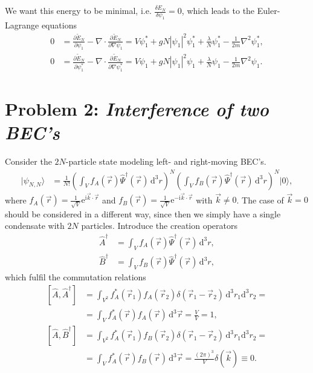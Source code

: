 \documentclass[english, parskip=full]{scrartcl}
\newcommand{\intr}{}
\newcommand{\kla}{}
\newcommand{\klam}{}
\newcommand{\tecxt}{}
\newcommand{\Ket}{}
\renewcommand{\i}{\text{i}}
\newcommand{\e}{\text{e}}
\begin{document}
We want this energy to be minimal, i.e. $\frac{\delta E_N}{\delta \psi_1} = 0$, which leads to the Euler-Lagrange equations
\begin{align}
0 &= \frac{\partial \tilde{E}_N}{\partial \psi_1} - \nabla\cdot \frac{\partial \tilde{E}_N}{\partial \nabla\psi_1} = V\psi_1^\ast + gN |\psi_1|^2 \psi_1^\ast + \frac{\lambda}{N}\psi_1^\ast - \frac{1}{2m}\nabla^2\psi_1^\ast,\\
0 &= \frac{\partial \tilde{E}_N}{\partial \psi_1^\ast} - \nabla\cdot \frac{\partial \tilde{E}_N}{\partial \nabla\psi_1^\ast} = V\psi_1 + gN |\psi_1|^2 \psi_1 + \frac{\lambda}{N}\psi_1 - \frac{1}{2m}\nabla^2\psi_1.
\end{align}




\newpage
\section*{Problem 2: \normalfont\textit{\large{Interference of two BEC's}}}
Consider the $2N$-particle state modeling left- and right-moving BEC's.
\begin{align}
\Ket | \psi_{N,N} \rangle &= \frac{1}{N!} \kla\left( \int_{V} f_A(\vec{r}) \hat{\Psi}^\dagger (\vec{r}) \, \mathrm{d}^{3}r \right)^N  \kla\left( \int_{V} f_B(\vec{r}) \hat{\Psi}^\dagger (\vec{r}) \, \mathrm{d}^{3}r \right)^N \Ket | 0 \rangle,
\end{align}
where $f_A(\vec{r}) = \frac{1}{\sqrt{V}} \e^{\i\vec{k}\cdot\vec{r}}$ and $f_B(\vec{r}) = \frac{1}{\sqrt{V}} \e^{-\i\vec{k}\cdot\vec{r}}$ with $\vec{k} \neq 0$. 
The case of $\vec{k} = 0$ should be considered in a different way, since then we simply have a single condensate with $2N$ particles.
Introduce the creation operators
\begin{align}
\hat{A}^\dagger &= \intr\int_{V} f_A(\vec{r})\hat{\Psi}^\dagger (\vec{r}) \, \mathrm{d}^{3}r,\\
\hat{B}^\dagger &= \intr\int_{V} f_B(\vec{r})\hat{\Psi}^\dagger (\vec{r}) \, \mathrm{d}^{3}r,
\end{align}
which fulfil the commutation relations 
\begin{align}
\klam\left[ \hat{A}, \hat{A}^\dagger  \right] &= \intr\int_{V^2} f_A^\ast(\vec{r}_1) f_A(\vec{r}_2) \delta (\vec{r}_1 - \vec{r}_2) \, \mathrm{d}^{3}r_1 \tecxt\text{d}^3r_2 = \\
&= \intr\int_{V} f_A^\ast(\vec{r}) f_A(\vec{r}) \, \mathrm{d}^{3}\vec{r} = \frac{V}{V} = 1, \\
\klam\left[ \hat{A}, \hat{B}^\dagger  \right] &= \intr\int_{V^2} f_A^\ast(\vec{r}_1) f_B(\vec{r}_2) \delta (\vec{r}_1 - \vec{r}_2) \, \mathrm{d}^{3}r_1 \tecxt\text{d}^3r_2 = \\
&= \intr\int_{V} f_A^\ast(\vec{r}) f_B(\vec{r}) \, \mathrm{d}^{3}\vec{r} = \frac{(2\pi)^3}{V} \delta (\vec{k}) \equiv 0.
\end{align}
\end{document}
